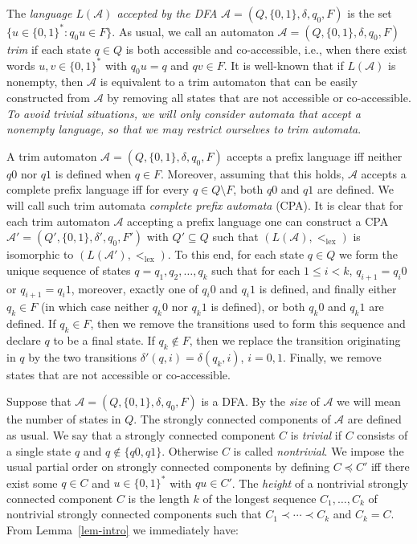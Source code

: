 \documentclass[copyright]{eptcs}
\newcommand{\cA}{\mathcal{A}}
\newcommand{\zo}{\{0,1\}}
\newcommand{\zos}{\{0,1\}^*}
\newcommand{\lex}{<_{\mathrm{lex}}}
\begin{document}
The \emph{language $L(\cA)$ accepted by the DFA} 
$\cA= (Q,\zo,\delta,q_0,F)$ is the set $\{ u \in \zos: 
q_0u \in F\}$. 
As usual, we call an automaton $\cA = (Q,\zo,\delta,q_0,F)$ \emph{trim}
if each state $q\in Q$ is both accessible and
co-accessible, i.e., when there exist words $u,v \in
\zos$ with $q_0u = q$ and $qv \in F$. It is well-known that 
if $L(\cA)$ is nonempty, then $\cA$ is equivalent to a 
trim automaton that can be easily constructed from $\cA$ 
by removing all states that are not accessible or co-accessible.
\emph{To avoid trivial situations, we will only consider 
automata that accept a nonempty language, so that we 
may restrict ourselves to trim automata}.

A trim automaton $\cA = (Q,\zo,\delta,q_0,F)$
accepts a prefix language iff neither $q0$ nor $q1$ is defined 
when $q \in F$.  Moreover, assuming that 
this holds, $\cA$ accepts a complete prefix language iff
for every $q\in Q\setminus F$, both $q0$ 
and $q1$ are defined. We will call such trim 
automata \emph{complete prefix automata} (CPA). It is clear that 
for each trim automaton $\cA$ accepting a prefix language 
one can construct a CPA $\cA' = (Q',\zo,\delta',q_0,F')$ 
with $Q' \subseteq Q$  such that $(L(\cA),\lex)$ is isomorphic to 
$(L(\cA'),\lex)$. To this end, for each state $q\in Q$ we 
form the unique sequence of states $q = q_1,q_2,\ldots,q_k$ 
such that for each $1 \leq i < k$, $q_{i+1} = q_i0$ or $q_{i+1} = q_i1$, 
moreover, exactly one of $q_i0$ and $q_i1$ is defined, and finally
either $q_k \in F$ (in which case neither $q_k0$ nor $q_k1$ is defined), 
or both $q_k0$ and $q_k1$ are defined. If $q_k \in F$, then we remove 
the transitions used to form this sequence and declare $q$ to be a final state. 
If $q_k \not\in F$, then we replace the transition originating in $q$
by the two transitions $\delta'(q,i) = \delta(q_k,i)$, $ i = 0,1$.
Finally, we remove states that are not accessible or co-accessible. 
 

Suppose that  $\cA = (Q,\zo,\delta,q_0,F)$ is a DFA. By the \emph{size} of $\cA$ 
we will mean the number of states in $Q$. 
The strongly connected components of $\cA$ 
are defined as usual. We say that a strongly connected component $C$ is \emph{trivial} 
if $C$ consists of a single state $q$ and $q \not\in \{q0,q1\}$.
Otherwise $C$ is called \emph{nontrivial}. 
We impose  the usual  
partial order on strongly connected components by defining $C \preceq C'$ iff 
there exist some $q \in C$ and $u \in \zos$ with $qu \in C'$. The \emph{height}
of a nontrivial strongly connected component $C$ is the length $k$ of the 
longest sequence $C_1,\ldots,C_k$ of nontrivial strongly connected 
components such that $C_1\prec \cdots \prec C_k$ and $C_k = C$. 
From Lemma~\ref{lem-intro} we immediately have:
\end{document}
